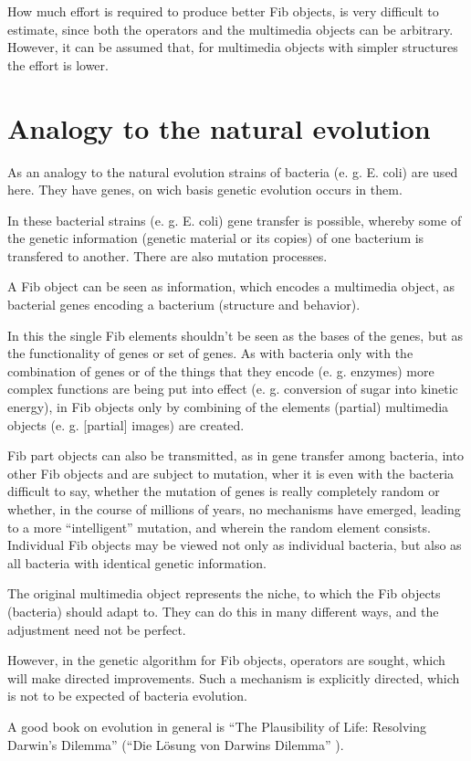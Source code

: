How much effort is required to produce better Fib objects, is very difficult to estimate, since both the operators and the multimedia objects can be arbitrary. However, it can be assumed that, for multimedia objects with simpler structures the effort is lower.


\section{Analogy to the natural evolution}

As an analogy to the natural evolution strains of bacteria (e. g. E. coli) are used here. They have genes, on wich basis genetic evolution occurs in them.

In these bacterial strains (e. g. E. coli) gene transfer is possible, whereby some of the genetic information (genetic material or its copies) of one bacterium is transfered to another. There are also mutation processes.

A Fib object can be seen as information, which encodes a multimedia object, as bacterial genes encoding a bacterium (structure and behavior).

In this the single Fib elements shouldn't be seen as the bases of the genes, but as the functionality of genes or set of genes. As with bacteria only with the combination of genes or of the things that they encode (e. g. enzymes) more complex functions are being put into effect (e. g. conversion of sugar into kinetic energy), in Fib objects only by combining of the elements (partial) multimedia objects (e. g. [partial] images) are created.

Fib part objects can also be transmitted, as in gene transfer among bacteria, into other Fib objects and are subject to mutation, wher it is even with the bacteria difficult to say, whether the mutation of genes is really completely random or whether, in the course of millions of years, no mechanisms have emerged, leading to a more ``intelligent'' mutation, and wherein the random element consists. Individual Fib objects may be viewed not only as individual bacteria, but also as all bacteria with identical genetic information.

The original multimedia object represents the niche, to which the Fib objects (bacteria) should adapt to. They can do this in many different ways, and the adjustment need not be perfect.

However, in the genetic algorithm for Fib objects, operators are sought, which will make directed improvements. Such a mechanism is explicitly directed, which is not to be expected of bacteria evolution.

A good book on evolution in general is ``The Plausibility of Life: Resolving Darwin's Dilemma'' (``Die L\"{o}sung von Darwins Dilemma'' \cite{LDD_2007}).

















